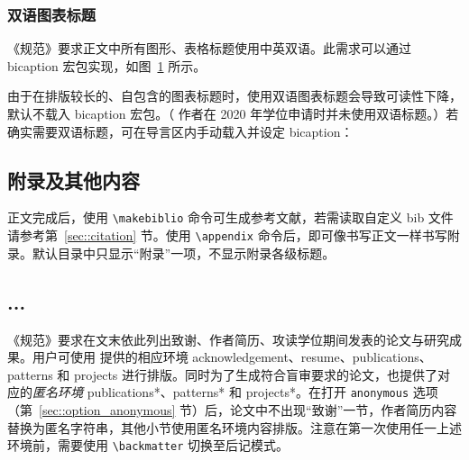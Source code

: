 \documentclass[bachelor, comfort]{shtthesis}
\begin{document}
\subsection{双语图表标题}
《规范》要求正文中所有图形、表格标题使用中英双语。此需求可以通过 \textsf{bicaption} 宏包实现，如图~\ref{img::sht_logo} 所示。
\begin{figure}[htb]
  \centering
  \label{img::sht_logo}
\end{figure}

由于在排版较长的、自包含的图表标题时，使用双语图表标题会导致可读性下降，\shtthesis 默认不载入 \textsf{bicaption} 宏包。（ \shtthesis 作者在 2020 年学位申请时并未使用双语标题。）若确实需要双语标题，可在导言区内手动载入并设定 \textsf{bicaption}：
\begin{latex}
\usepackage[list=off]{bicaption}
\captionsetup[figure][bi-second]{name=Figure}
\captionsetup[table][bi-second]{name=Table}
\end{latex}

\section{附录及其他内容} \label{sec::backmatter}
正文完成后，使用 \verb|\makebiblio| 命令可生成参考文献，若需读取自定义 bib 文件请参考第~\ref{sec::citation} 节。使用 \verb|\appendix| 命令后，即可像书写正文一样书写附录。默认目录中只显示“附录”一项，不显示附录各级标题。
\begin{latex}
\appendix
\chapter{...}
\end{latex}

《规范》要求在文末依此列出致谢、作者简历、攻读学位期间发表的论文与研究成果。用户可使用 \shtthesis 提供的相应环境 acknowledgement、resume、publications、patterns 和 projects 进行排版。同时为了生成符合盲审要求的论文，\shtthesis 也提供了对应的\emph{匿名环境} publications*、patterns* 和 projects*。在打开 \verb|anonymous| 选项（第~\ref{sec::option_anonymous} 节）后，论文中不出现“致谢”一节，作者简历内容替换为匿名字符串，其他小节使用匿名环境内容排版。注意在第一次使用任一上述环境前，需要使用 \verb|\backmatter| 切换至后记模式。
\end{document}
